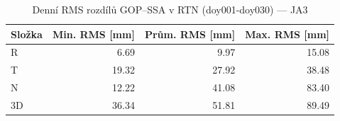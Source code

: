 \begin{table}[H]
\centering
\caption{Denní RMS rozdílů GOP–SSA v RTN (doy001-doy030) — JA3}
\label{tab:j3_ZAZG_doy001-doy030_rms}
\begin{tabular}{lrrr}
\toprule
Složka & Min. RMS [mm] & Prům. RMS [mm] & Max. RMS [mm] \\
\midrule
R & 6.69 & 9.97 & 15.08 \\
T & 19.32 & 27.92 & 38.48 \\
N & 12.22 & 41.08 & 83.40 \\
3D & 36.34 & 51.81 & 89.49 \\
\bottomrule
\end{tabular}
\end{table}
